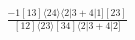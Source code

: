 \documentclass[varwidth, border=5pt]{standalone}
\begin{document}
\begin{my}
$\begin{gathered}
\scriptscriptstyle\frac{-1[13]⟨24⟩⟨2|3+4|1][23]}{[12]⟨23⟩[34]⟨2|3+4|2]}
\end{gathered}$
\end{my}
\end{document}
